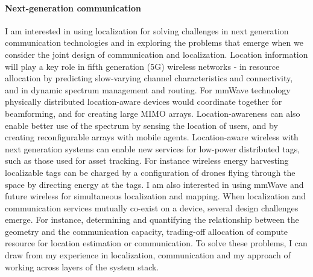 \documentclass[10pt]{article}
\begin{document}

\paragraph{Next-generation communication}
I am interested in using localization for solving challenges in next generation communication technologies and in exploring the problems that emerge when we consider the joint design of communication and localization. Location information will play a key role in fifth generation (5G) wireless networks - in resource allocation by predicting slow-varying channel characteristics and connectivity, and in dynamic spectrum management and routing. 
For mmWave technology physically distributed location-aware devices would coordinate together for beamforming, and for creating large MIMO arrays. %
Location-awareness can also enable better use of the spectrum by sensing the location of users, and by creating reconfigurable arrays with mobile agents. 
Location-aware wireless with next generation systems can enable new services for low-power distributed tags, such as those used for asset tracking. %
For instance wireless energy harvesting localizable tags can be charged by a configuration of drones flying through the space by directing energy at the tags. %
I am also interested in using mmWave and future wireless for simultaneous localization and mapping. 
When localization and communication services mutually co-exist on a device, several design challenges emerge. For instance, determining and quantifying the relationship between the geometry and the communication capacity, trading-off allocation of compute resource for location estimation or communication. To solve these problems, I can draw from my experience in localization, communication and my approach of working across layers of the system stack.  %
\end{document}

